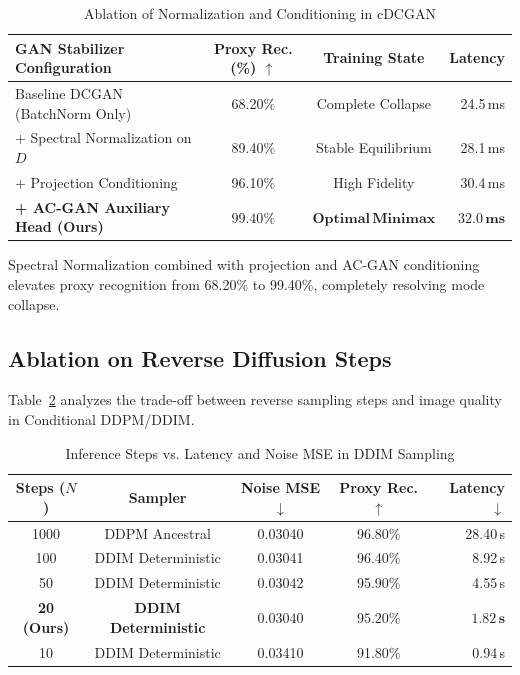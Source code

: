 \documentclass[journal]{IEEEtran}
\begin{document}
\begin{table}[htbp]
\caption{Ablation of Normalization and Conditioning in cDCGAN}
\label{tab:ablation_gan}
\centering
\scriptsize
\renewcommand{\arraystretch}{1.12}
\setlength{\tabcolsep}{4pt}
\begin{tabularx}{\columnwidth}{@{}X c c r@{}}
\toprule
\textbf{GAN Stabilizer Configuration} & \textbf{Proxy Rec. (\%)} $\uparrow$ & \textbf{Training State} & \textbf{Latency} \\
\midrule
Baseline DCGAN (BatchNorm Only) & 68.20\% & Complete Collapse & 24.5\,ms \\
+ Spectral Normalization on $D$ & 89.40\% & Stable Equilibrium & 28.1\,ms \\
+ Projection Conditioning & 96.10\% & High Fidelity & 30.4\,ms \\
\textbf{+ AC-GAN Auxiliary Head (Ours)} & $\mathbf{99.40\%}$ & $\mathbf{Optimal\,Minimax}$ & $\mathbf{32.0\,ms}$ \\
\bottomrule
\end{tabularx}
\end{table}

Spectral Normalization combined with projection and AC-GAN conditioning elevates proxy recognition from 68.20\% to 99.40\%, completely resolving mode collapse.

\subsection{Ablation on Reverse Diffusion Steps}
Table~\ref{tab:ablation_ddim} analyzes the trade-off between reverse sampling steps and image quality in Conditional DDPM/DDIM.

\begin{table}[htbp]
\caption{Inference Steps vs. Latency and Noise MSE in DDIM Sampling}
\label{tab:ablation_ddim}
\centering
\scriptsize
\renewcommand{\arraystretch}{1.12}
\setlength{\tabcolsep}{4pt}
\begin{tabularx}{\columnwidth}{@{}c c c c r@{}}
\toprule
\textbf{Steps ($N$)} & \textbf{Sampler} & \textbf{Noise MSE} $\downarrow$ & \textbf{Proxy Rec.} $\uparrow$ & \textbf{Latency} $\downarrow$ \\
\midrule
1000 & DDPM Ancestral & 0.03040 & 96.80\% & 28.40\,s \\
100 & DDIM Deterministic & 0.03041 & 96.40\% & 8.92\,s \\
50 & DDIM Deterministic & 0.03042 & 95.90\% & 4.55\,s \\
\textbf{20 (Ours)} & \textbf{DDIM Deterministic} & $\mathbf{0.03040}$ & $\mathbf{95.20\%}$ & $\mathbf{1.82\,s}$ \\
10 & DDIM Deterministic & 0.03410 & 91.80\% & 0.94\,s \\
\bottomrule
\end{tabularx}
\end{table}
\end{document}
